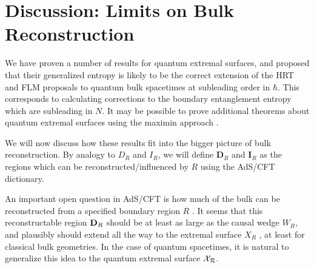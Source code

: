 \documentclass[12pt]{article}
\theoremstyle{remark}
\numberwithin{equation}{section}
\numberwithin{equation}{section}
\begin{document}
%

\section{Discussion: Limits on Bulk Reconstruction}\label{discussion}

We have proven a number of results for quantum extremal surfaces, and proposed that their generalized entropy is likely to be the correct extension of the HRT and FLM proposals to quantum bulk spacetimes at subleading order in $\hbar$.  This corresponds to calculating corrections to the boundary entanglement entropy which are subleading in $N$. It may be possible to prove additional theorems about quantum extremal surfaces using the maximin approach \cite{WallMaximin}.

We will now discuss how these results fit into the bigger picture of bulk reconstruction.  By analogy to $D_R$ and $I_R$, we will define $\mathbf{D}_R$ and $\mathbf{I}_R$ as the regions which can be reconstructed/influenced by $R$ using the AdS/CFT dictionary.

An important open question in AdS/CFT is how much of the bulk can be reconstructed from a specified boundary region $R$ \cite{HubenyRangamani, Bousso:2012sj, Czech:2012bh}.  It seems that this reconstructable region ${\bf D}_R$ should be at least as large as the causal wedge $W_R$, and plausibly should extend all the way to the extremal surface $X_R$ \cite{Wall12}, at least for classical bulk geometries.  In the case of quantum spacetimes, it is natural to generalize this idea to the quantum extremal surface ${\cal X_R}$.
\end{document}
